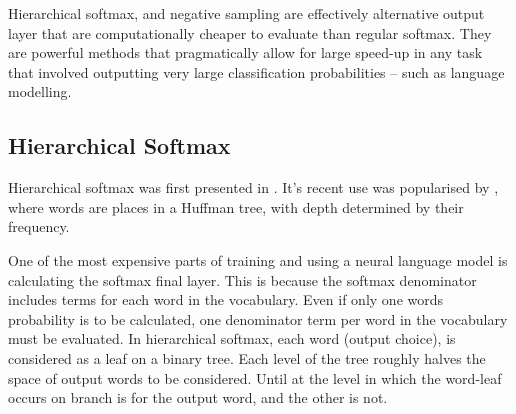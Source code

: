 \documentclass[parskip]{komatufte}
\begin{document}
Hierarchical softmax, and negative sampling are effectively alternative output layer that are computationally cheaper to evaluate than regular softmax.
They are powerful methods that pragmatically allow for large speed-up in any task that involved outputting very large classification probabilities -- such as language modelling.


\subsection{Hierarchical Softmax}
Hierarchical softmax was first presented in  .
It's recent use was popularised by , where words are places in a Huffman tree, with depth determined by their frequency.



One of the most expensive parts of training and using a neural language model is calculating the softmax final layer.
This is because the softmax denominator includes terms for each word in the vocabulary.
Even if only one words probability is to be calculated, one denominator term per word in the vocabulary must be evaluated.
In hierarchical softmax, each word (output choice), is considered as a leaf on a binary tree.
Each level of the tree roughly halves the space of output words to be considered.
Until at the level in which the word-leaf occurs on branch is for the output word, and the other is not.
\end{document}
